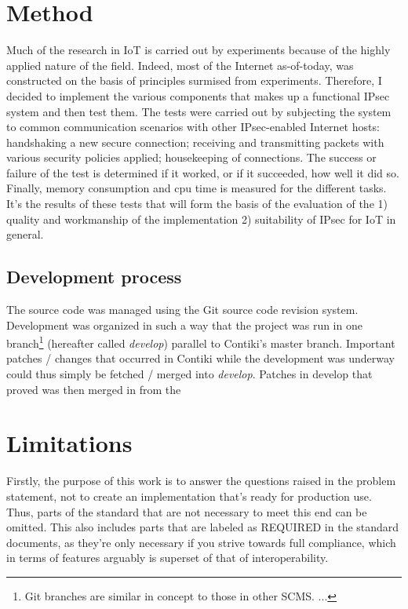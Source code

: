 \documentclass[final,a4paper,twoside,11pt,onecolumn]{report}
\begin{document}
\section{Method}
Much of the research in IoT is carried out by experiments because of the highly applied nature of the field. Indeed, most of the Internet as-of-today, was constructed on the basis of principles surmised from experiments. Therefore, I decided to implement the various components that makes up a functional IPsec system and then test them. The tests were carried out by subjecting the system to common communication scenarios with other IPsec-enabled Internet hosts: handshaking a new secure connection; receiving and transmitting packets with various security policies applied; housekeeping of connections. The success or failure of the test is determined if it worked, or if it succeeded, how well it did so. Finally, memory consumption and cpu time is measured for the different tasks. It's the results of these tests that will form the basis of the evaluation of the 1) quality and workmanship of the implementation 2) suitability of IPsec for IoT in general.

\subsection{Development process}
The source code was managed using the Git source code revision system. Development was organized in such a way that the project was run in one branch\footnote{Git branches are similar in concept to those in other SCMS. ...} (hereafter called \emph{develop}) parallel to Contiki's master branch. Important patches / changes that occurred in Contiki while the development was underway could thus simply be fetched / merged into \emph{develop}. Patches in develop that proved  was then merged in from the 

\section{Limitations}
Firstly, the purpose of this work is to answer the questions raised in the problem statement, not to create an implementation that's ready for production use. Thus, parts of the standard that are not necessary to meet this end can be omitted. This also includes parts that are labeled as REQUIRED in the standard documents, as they're only necessary if you strive towards full compliance, which in terms of features arguably is superset of that of interoperability.
\end{document}
